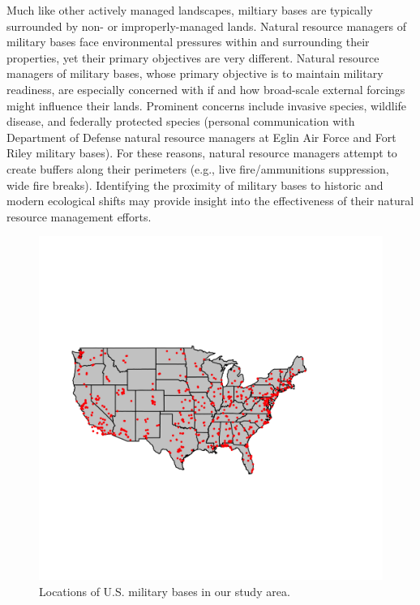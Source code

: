 \documentclass[12pt,twoside,openany]{reedthesis}
\begin{document}
Much like other actively managed landscapes, miltiary bases are
typically surrounded by non- or improperly-managed lands. Natural
resource managers of military bases face environmental pressures within
and surrounding their properties, yet their primary objectives are very
different. Natural resource managers of military bases, whose primary
objective is to maintain military readiness, are especially concerned
with if and how broad-scale external forcings might influence their
lands. Prominent concerns include invasive species, wildlife disease,
and federally protected species (personal communication with Department
of Defense natural resource managers at Eglin Air Force and Fort Riley
military bases). For these reasons, natural resource managers attempt to
create buffers along their perimeters (e.g., live fire/ammunitions
suppression, wide fire breaks). Identifying the proximity of military
bases to historic and modern ecological shifts may provide insight into
the effectiveness of their natural resource management efforts.
\begin{figure}

{\centering \includegraphics[width=0.95\linewidth]{./chapterFiles/fisherSpatial/figures/figsCalledInDiss/milBases} 

}

\caption{Locations of U.S. military bases in our study area.}\label{fig:milBases}
\end{figure}
\end{document}
